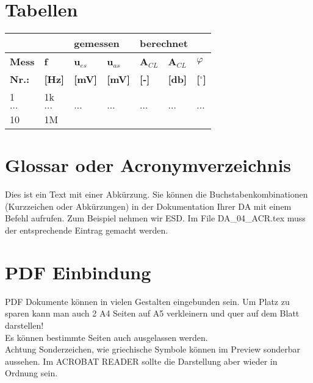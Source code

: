 \documentclass[a4paper, 12pt, xcolor=dvipsnames]{scrartcl}	%
\begin{document}
%
%
\section{Tabellen}

\begin{center}
\begin{tabular}{|p{0.9in}|p{0.5in}|p{0.5in}|p{0.5in}|p{0.5in}|p{0.5in}|p{0.5in}|} \hline 
\multicolumn{2}{|p{1in}|}{} & \multicolumn{2}{|p{0.9in}|}{\textbf{gemessen}} & \multicolumn{3}{|p{1.0in}|}{\textbf{berechnet}} \\ \hline 
\textbf{}\textbf{Mess} & \textbf{f} & \textbf{u${}_{es}$} & \textbf{u${}_{as}$}  & \textbf{A${}_{CL}$} & \textbf{A${}_{CL}$} & \textbf{$\varphi$} \\ \hline 
\textbf{}\textbf{Nr.:} &\textbf{[Hz]} & \textbf{[mV]} & \textbf{[mV]} & \textbf{[-]} & \textbf{[db]}  & \textbf{[${}^\circ$]} \\ \hline 
1 & 1k &  &  &  & &  \\ \hline 
$\dots$& $\dots$& $\dots$& $\dots$&$\dots$&$\dots$&$\dots$ \\ \hline 
10 & 1M &  &  &  &  &\\ \hline 
\end{tabular}
\end{center}
%
%

\section{Glossar oder Acronymverzeichnis}
Dies ist ein Text mit einer Abkürzung. Sie können die Buchstabenkombinationen (Kurzzeichen oder Abkürzungen) in der Dokumentation Ihrer \acs{DA} mit einem Befehl aufrufen. Zum Beispiel nehmen wir \acs{ESD}. Im File DA\_04\_ACR.tex muss der entsprechende Eintrag gemacht werden.

\section{PDF Einbindung}
PDF Dokumente können in vielen Gestalten eingebunden sein. Um Platz zu sparen kann man auch 2 A4 Seiten auf A5 verkleinern und quer auf dem Blatt darstellen!\\

Es können bestimmte Seiten auch ausgelassen werden.\\

Achtung Sonderzeichen, wie griechische Symbole können im Preview sonderbar aussehen. Im ACROBAT READER sollte die Darstellung aber wieder in Ordnung sein.
\end{document}
